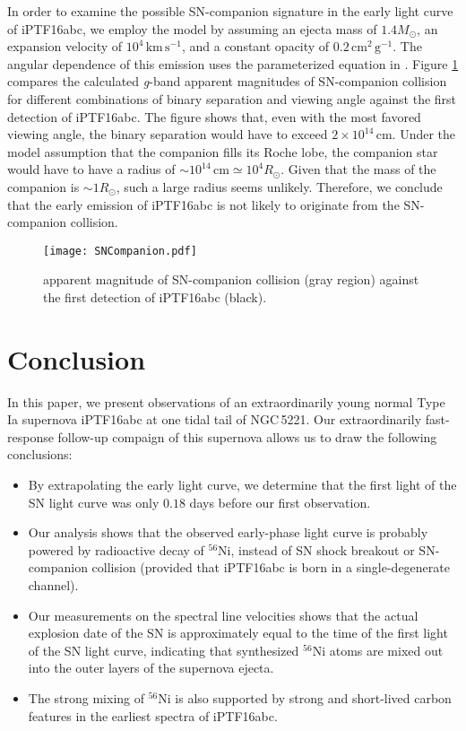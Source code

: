 \documentclass[twocolumn]{aastex61}
\newcommand{\sm}{M_\odot}
\newcommand{\sr}{R_\odot}
\begin{document}
In order to examine the possible SN-companion signature in the early
light curve of iPTF16abc, we employ the \citet{2010ApJ...708.1025K}
model by assuming an ejecta mass of $1.4\sm$, an expansion velocity of
$10^{4}\,\textrm{km}\,\textrm{s}^{-1}$, and a constant opacity of
$0.2\,\textrm{cm}^2\,\textrm{g}^{-1}$. The angular dependence of this
emission uses the parameterized equation in
\citet{2012ApJ...749...18B}.  Figure \ref{fig:SN-companion} compares
the calculated \textit{g}-band apparent magnitudes of SN-companion
collision for different combinations of binary separation and viewing
angle against the first detection of iPTF16abc. The figure shows that,
even with the most favored viewing angle, the binary separation would
have to exceed $2\times10^{14}\,\textrm{cm}$. Under the model assumption that the
companion fills its Roche lobe, the companion star would have to have
a radius of $\sim10^{14}\,\textrm{cm}\simeq10^{4}\sr$. Given that the
mass of the companion is $\sim1\sr$, such a large radius seems unlikely.
Therefore, we conclude that the early emission of iPTF16abc is not likely
to originate from the SN-companion collision.

\begin{figure}[!thb]
  \centering
  \texttt{[image: SNCompanion.pdf]}
  \caption{apparent magnitude of SN-companion collision (gray region)
    against the first detection of iPTF16abc (black).}
  \label{fig:SN-companion}
\end{figure}

\section{Conclusion}
\label{sec:conclusion}

In this paper, we present observations of an extraordinarily young
normal Type Ia supernova iPTF16abc at one tidal tail of NGC\,5221. Our
extraordinarily fast-response follow-up compaign of this supernova
allows us to draw the following conclusions:
\begin{itemize}
  \item By extrapolating the early light curve, we determine that the
    first light of the SN light curve was only $0.18$ days before our
    first observation.
  \item Our analysis shows that the observed early-phase light curve is
    probably powered by radioactive decay of $^{56}$Ni, instead of SN
    shock breakout or SN-companion collision (provided that iPTF16abc
    is born in a single-degenerate channel).
  \item Our measurements on the spectral line velocities shows that the
    actual explosion date of the SN is approximately equal to the time
    of the first light of the SN light curve, indicating that
    synthesized $^{56}$Ni atoms are mixed out into the outer layers of
    the supernova ejecta.
  \item The strong mixing of $^{56}$Ni is also supported by strong and
    short-lived carbon features in the earliest spectra of iPTF16abc.
\end{itemize}
\end{document}
